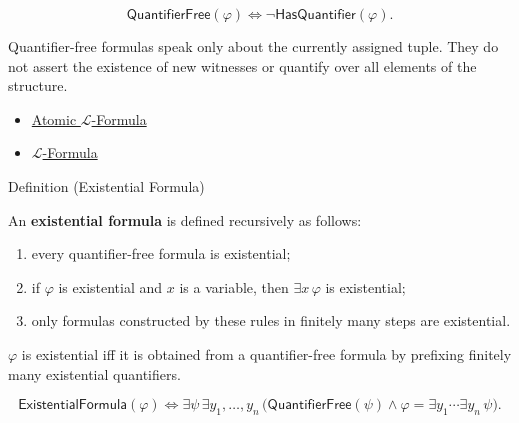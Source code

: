 \begin{remark*}
\[
\mathsf{QuantifierFree}(\varphi)
\Longleftrightarrow
\lnot\mathsf{HasQuantifier}(\varphi).
\]
\end{remark*}

\begin{remark*}[Interpretation]
Quantifier-free formulas speak only about the currently assigned tuple. They
do not assert the existence of new witnesses or quantify over all elements of
the structure.
\end{remark*}

\begin{dependencies}
\begin{itemize}
  \item \hyperref[def:l-atomic-formula]{Atomic $\mathcal{L}$-Formula}
  \item \hyperref[def:l-formula]{$\mathcal{L}$-Formula}
\end{itemize}
\end{dependencies}

\begin{definitionbox}{Definition (Existential Formula)}
\begin{definition}\label{def:existential-formula}
An \textbf{existential formula} is defined recursively as follows:
\begin{enumerate}
  \item every quantifier-free formula is existential;
  \item if $\varphi$ is existential and $x$ is a variable, then
        $\exists x\,\varphi$ is existential;
  \item only formulas constructed by these rules in finitely many steps are
        existential.
\end{enumerate}
\end{definition}
\end{definitionbox}

\begin{remark*}
$\varphi$ is existential iff it is obtained from a quantifier-free formula by
prefixing finitely many existential quantifiers.
\end{remark*}

\begin{remark*}
\[
\mathsf{ExistentialFormula}(\varphi)
\Longleftrightarrow
\exists\psi\,\exists y_1,\ldots,y_n\,
\bigl(\mathsf{QuantifierFree}(\psi)
\land \varphi=\exists y_1\cdots\exists y_n\,\psi\bigr).
\]
\end{remark*}

